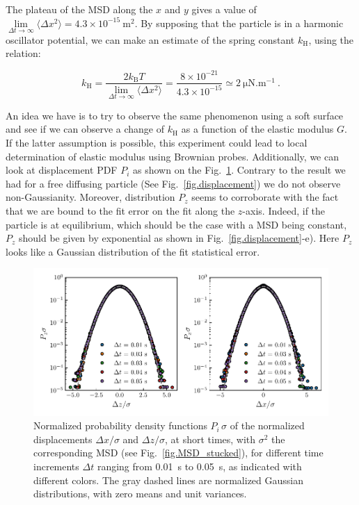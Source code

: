 The plateau of the MSD along the $x$ and $y$ gives a value of  $ \lim\limits_{\Delta t \rightarrow \infty }\langle \Delta x ^2 \rangle = 4.3 \times 10 ^{-15} ~ \mathrm{m^2}$. By supposing that the particle is in a harmonic oscillator potential, we can make an estimate of the spring constant $k_\mathrm{H}$, using the relation:

\begin{equation}
	k_\mathrm{H} = \frac{ 2 k_\mathrm{B} T}{ \lim\limits_{\Delta t \rightarrow \infty }\langle \Delta x ^2 \rangle} = \frac{8 \times 10^{-21}}{4.3 \times 10 ^{-15}} \simeq 2 ~ \mathrm{\mu N . m^{-1}}~.
\end{equation}

An idea we have is to try to observe the same phenomenon using a soft surface and see if we can observe a change of $k_\mathrm{H}$ as a function of the elastic modulus $G$. If the latter assumption is possible, this experiment could lead to local determination of elastic modulus using Brownian probes. Additionally, we can look at displacement \gls{PDF} $P_i$ as shown on the Fig.~\ref{fig.P_dxz_stucked}. Contrary to the result we had for a free diffusing particle (See Fig.~\ref{fig.displacement}) we do not observe non-Gaussianity. Moreover, distribution $P_z$ seems to corroborate with the fact that we are bound to the fit error on the fit along the $z$-axis. Indeed, if the particle is at equilibrium, which should be the case with a MSD being constant, $P_z$ should be given by exponential as shown in Fig.~\ref{fig.displacement}-e). Here $P_z$ looks like a Gaussian distribution of the fit statistical error.


\begin{figure}[H]
	\centering
	\includegraphics{02_body/chapter4/images/stucked_particle/P_xz_stucked.pdf}
	\caption{ Normalized probability density functions $P_i\,\sigma$ of the normalized displacements $\Delta x/\sigma$ and $\Delta z/\sigma$, at short times, with $\sigma^2$ the corresponding MSD (see Fig.~\ref{fig.MSD_stucked}), for different time increments $\Delta t$ ranging from 0.01~s to 0.05~s, as indicated with different colors. The gray dashed lines are normalized Gaussian distributions, with zero means and unit variances.}
	\label{fig.P_dxz_stucked}
\end{figure}

